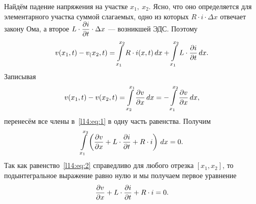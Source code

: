 Найдём падение напряжения на участке $x_1,\ x_2$. Ясно, что оно определяется для элементарного участка суммой слагаемых, одно из которых $R\cdot i\cdot\Delta x$ отвечает закону Ома, а второе $\displaystyle L\cdot\frac{\partial i}{\partial t}\cdot\Delta x$ --- возникшей ЭДС. Поэтому 
\begin{equation}\label{l14:eq:1}
	\hfill v(x_1,t)-v_(x_2,t)=\int\limits_{x_1}^{x_2}R\cdot i(x,t)\,dx+\int\limits_{x_1}^{x_2}L\cdot\pder{i}{t}\,dx.\hfill
\end{equation}
Записывая
\begin{equation*}
	\hfill v(x_1,t)-v(x_2,t)=\int\limits_{x_2}^{x_1}\pder{v}{x}\,dx=-\int\limits_{x_1}^{x_2}\pder{v}{x}\,dx,\hfill
\end{equation*}
перенесём все члены в~\eqref{l14:eq:1} в одну часть равенства. Получим 
\begin{equation}\label{l14:eq:2}
	\hfill \int\limits_{x_1}^{x_2}\left(\pder{v}{x}+L\cdot\pder{i}{t}+R\cdot i\right)\,dx=0.\hfill
\end{equation}
Так как равенство~\eqref{l14:eq:2} справедливо для любого отрезка $[x_1,x_2]$, то подынтегральное выражение равно нулю и мы получаем первое уравнение
\begin{equation}\label{l14:eq:3}
	\hfill \pder{v}{x}+L\cdot\pder{i}{t}+R\cdot i=0.\hfill
\end{equation}

